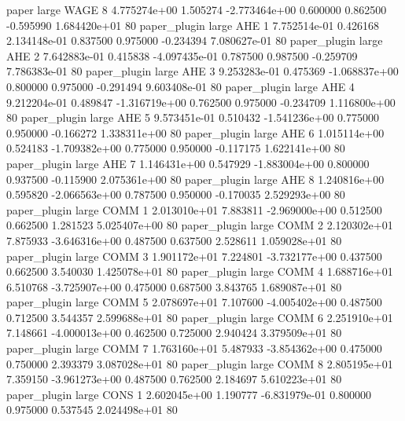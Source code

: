               paper      large     WAGE                 8 4.775274e+00      1.505274 -2.773464e+00 0.600000 0.862500      -0.595990 1.684420e+01 80
       paper_plugin      large      AHE                 1 7.752514e-01      0.426168  2.134148e-01 0.837500 0.975000      -0.234394 7.080627e-01 80
       paper_plugin      large      AHE                 2 7.642883e-01      0.415838 -4.097435e-01 0.787500 0.987500      -0.259709 7.786383e-01 80
       paper_plugin      large      AHE                 3 9.253283e-01      0.475369 -1.068837e+00 0.800000 0.975000      -0.291494 9.603408e-01 80
       paper_plugin      large      AHE                 4 9.212204e-01      0.489847 -1.316719e+00 0.762500 0.975000      -0.234709 1.116800e+00 80
       paper_plugin      large      AHE                 5 9.573451e-01      0.510432 -1.541236e+00 0.775000 0.950000      -0.166272 1.338311e+00 80
       paper_plugin      large      AHE                 6 1.015114e+00      0.524183 -1.709382e+00 0.775000 0.950000      -0.117175 1.622141e+00 80
       paper_plugin      large      AHE                 7 1.146431e+00      0.547929 -1.883004e+00 0.800000 0.937500      -0.115900 2.075361e+00 80
       paper_plugin      large      AHE                 8 1.240816e+00      0.595820 -2.066563e+00 0.787500 0.950000      -0.170035 2.529293e+00 80
       paper_plugin      large     COMM                 1 2.013010e+01      7.883811 -2.969000e+00 0.512500 0.662500       1.281523 5.025407e+00 80
       paper_plugin      large     COMM                 2 2.120302e+01      7.875933 -3.646316e+00 0.487500 0.637500       2.528611 1.059028e+01 80
       paper_plugin      large     COMM                 3 1.901172e+01      7.224801 -3.732177e+00 0.437500 0.662500       3.540030 1.425078e+01 80
       paper_plugin      large     COMM                 4 1.688716e+01      6.510768 -3.725907e+00 0.475000 0.687500       3.843765 1.689087e+01 80
       paper_plugin      large     COMM                 5 2.078697e+01      7.107600 -4.005402e+00 0.487500 0.712500       3.544357 2.599688e+01 80
       paper_plugin      large     COMM                 6 2.251910e+01      7.148661 -4.000013e+00 0.462500 0.725000       2.940424 3.379509e+01 80
       paper_plugin      large     COMM                 7 1.763160e+01      5.487933 -3.854362e+00 0.475000 0.750000       2.393379 3.087028e+01 80
       paper_plugin      large     COMM                 8 2.805195e+01      7.359150 -3.961273e+00 0.487500 0.762500       2.184697 5.610223e+01 80
       paper_plugin      large     CONS                 1 2.602045e+00      1.190777 -6.831979e-01 0.800000 0.975000       0.537545 2.024498e+01 80
